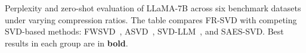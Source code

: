 
\begin{table}[t]
\centering
\footnotesize
\renewcommand{\arraystretch}{1.15}
\setlength{\tabcolsep}{3.2pt}

\caption{Perplexity and zero-shot evaluation of LLaMA-7B across six benchmark datasets
under varying compression ratios. The table compares FR-SVD with competing SVD-based
methods: FWSVD~\cite{hsu2022fwsvd}, ASVD~\cite{yuan2023asvd},
SVD-LLM~\cite{wang2025svdllm}, and SAES-SVD.
Best results in each group are in \textbf{bold}.}
\label{tab:main-results-full}


\end{table}
